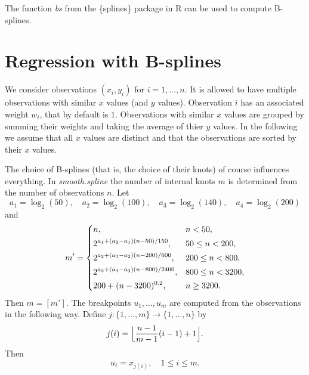 \documentclass[a4paper]{scrartcl}
\begin{document}
The function \textit{bs} from the \{splines\} package in R can be used to compute B-splines.


\section{Regression with B-splines}
\label{sec:regression}

We consider observations $(x_i, y_i)$ for $i = 1, \ldots, n$. 
It is allowed to have multiple observations with similar $x$ values (and $y$ values).
Observation $i$ has an associated weight $w_i$, that by default is $1$.
Observations with similar $x$ values are grouped by summing their weights and taking the average of thier $y$ values.
In the following we assume that all $x$ values are distinct and that the observations are sorted by their $x$ values.

The choice of B-splines (that is, the choice of their knots) of course influences everything.
In \textit{smooth.spline} the number of internal knots $m$ is determined from the number of observations $n$.
Let
\begin{equation*}
    a_1 = \log_2(50),
    \quad
    a_2 = \log_2(100),
    \quad
    a_3 = \log_2(140),
    \quad
    a_4 = \log_2(200)
\end{equation*}
and
\begin{equation*}
    m' =
    \begin{dcases}
        n, & n < 50,
        \\
        2^{a_1 + (a_2 - a_1) (n - 50) / 150}, & 50 \leq n < 200,
        \\
        2^{a_2 + (a_3 - a_2) (n - 200) / 600}, & 200 \leq n < 800,
        \\
        2^{a_3 + (a_4 - a_3) (n - 800) / 2400}, & 800 \leq n < 3200,
        \\
        200 + (n - 3200)^{0.2}, & n \geq 3200.
    \end{dcases}
\end{equation*}
Then $m = [m']$.
The breakpoints $u_1, \dots, u_m$ are computed from the observations in the following way.
Define $j: \{1, \dots, m\} \rightarrow \{1, \dots, n\}$ by
\begin{equation*}
    j(i) =
    \Bigl\lfloor\frac{n - 1}{m - 1} (i - 1) + 1\Bigr\rfloor.
\end{equation*}
Then
\begin{equation*}
    u_i = x_{j(i)},
    \quad
    1\leq i\leq m.
\end{equation*}
\end{document}

